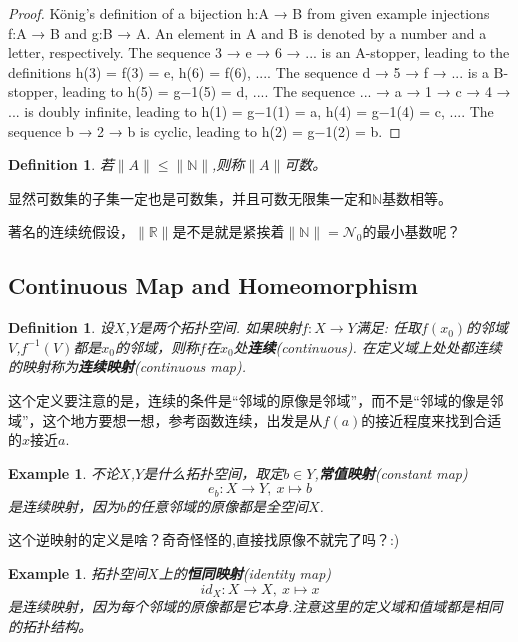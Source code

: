 \documentclass{article}
\newtheorem{example}[theorem]{Example}
\newtheorem{definition}[theorem]{Definition}
\newcommand*{\xfunc}[4]{{#2}\colon{#3}{#1}{#4}}
\newcommand*{\func}[3]{\xfunc{\to}{#1}{#2}{#3}}
\begin{document}
\begin{proof}
König's definition of a bijection h:A → B from given example injections f:A → B and g:B → A. An element in A and B is denoted by a number and a letter, respectively. The sequence 3 → e → 6 → ... is an A-stopper, leading to the definitions h(3) = f(3) = e, h(6) = f(6), .... The sequence d → 5 → f → ... is a B-stopper, leading to h(5) = g−1(5) = d, .... The sequence ... → a → 1 → c → 4 → ... is doubly infinite, leading to h(1) = g−1(1) = a, h(4) = g−1(4) = c, .... The sequence b → 2 → b is cyclic, leading to h(2) = g−1(2) = b.

\end{proof}


\begin{definition}
若$\|A\| \leqslant \|\mathbb{N}\|$,则称$\|A\|$可数。 
\end{definition}

显然可数集的子集一定也是可数集，并且可数无限集一定和$\mathbb{N}$基数相等。

著名的连续统假设，$\|\mathbb{R}\|$是不是就是紧挨着$\|\mathbb{N}\|=\mathcal{N}_0$的最小基数呢？
\newpage
\subsection{Continuous Map and Homeomorphism}

\begin{definition}
设$X$,$Y$是两个拓扑空间. 如果映射$\func{f}{X}{Y}$满足: 任取$f(x_0)$的邻域$V$,$f^{-1}(V)$都是$x_0$的邻域，则称$f$在$x_0$处\textbf{连续}(continuous). 在定义域上处处都连续的映射称为\textbf{连续映射}(continuous map).
\end{definition}

这个定义要注意的是，连续的条件是“邻域的原像是邻域”，而不是“邻域的像是邻域”，这个地方要想一想，参考函数连续，出发是从$f(a)$的接近程度来找到合适的$x$接近$a$.

\begin{example}
不论$X$,$Y$是什么拓扑空间，取定$b \in Y$,\textbf{常值映射}(constant map)\[\func{e_b}{X}{Y},\ x \mapsto b\]是连续映射，因为$b$的任意邻域的原像都是全空间$X$.
\end{example}

这个逆映射的定义是啥？奇奇怪怪的,直接找原像不就完了吗？:)

\begin{example}
拓扑空间$X$上的\textbf{恒同映射}(identity map)\[\func{id_{X}}{X}{X},\ x\mapsto x\]是连续映射，因为每个邻域的原像都是它本身.注意这里的定义域和值域都是相同的拓扑结构。
\end{example}
\end{document}
